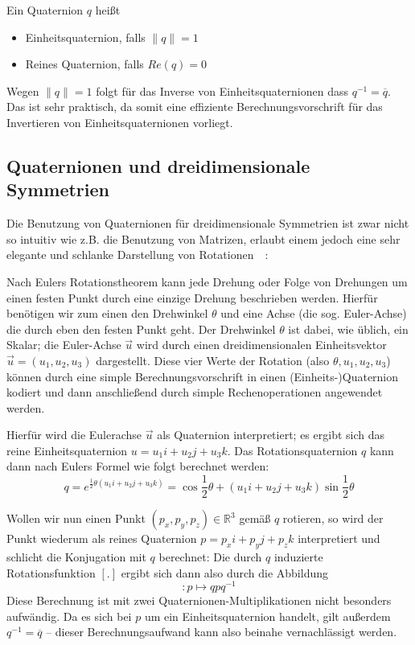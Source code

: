 \begin{definition}
Ein Quaternion $q$ heißt 
\begin{itemize}
\item Einheitsquaternion, falls $\|q\| = 1$
\item Reines Quaternion, falls $Re(q) = 0$
\end{itemize}\vspace{-0.9cm}
\end{definition}
Wegen $\|q\| = 1$ folgt für das Inverse von Einheitsquaternionen dass $q^{-1} = \overline{q}$. Das ist sehr praktisch,
da somit eine effiziente Berechnungsvorschrift für das Invertieren von Einheitsquaternionen vorliegt.

\subsection{Quaternionen und dreidimensionale Symmetrien}
Die Benutzung von Quaternionen für dreidimensionale Symmetrien ist zwar nicht so intuitiv wie z.B. die Benutzung von Matrizen,
erlaubt einem jedoch eine sehr elegante und schlanke Darstellung von Rotationen~\cite{conway2003}~\cite{du1964}: 

Nach Eulers Rotationstheorem kann jede Drehung oder Folge von Drehungen um einen festen Punkt durch eine einzige Drehung beschrieben werden.
Hierfür benötigen wir zum einen den Drehwinkel $\theta$ und eine Achse (die sog. Euler-Achse) die durch eben den festen Punkt geht.
Der Drehwinkel $\theta$ ist dabei, wie üblich, ein Skalar; die Euler-Achse $\overrightarrow{u}$ wird durch einen dreidimensionalen Einheitsvektor $\overrightarrow{u} = (u_1,u_2,u_3)$ dargestellt. Diese vier Werte der Rotation (also $\theta, u_1, u_2, u_3$) können durch eine simple
Berechnungsvorschrift in einen (Einheits-)Quaternion kodiert und dann anschließend durch simple Rechenoperationen
angewendet werden.

Hierfür wird die Eulerachse $\overrightarrow{u}$ als Quaternion interpretiert; es ergibt sich das reine Einheitsquaternion
$u = u_1 i + u_2 j + u_3 k$. Das Rotationsquaternion $q$ kann dann nach Eulers Formel wie folgt berechnet werden:
\begin{equation*}
q = e^{\frac{1}{2} \theta \left( u_1 i + u_2 j + u_3 k \right)} = \cos \frac{1}{2} \theta + \left( u_1 i + u_2 j + u_3 k \right) \sin \frac{1}{2} \theta
\end{equation*}

\noindent Wollen wir nun einen Punkt $(p_x, p_y, p_z) \in \mathbb{R}^3$ gemäß $q$ rotieren, so wird der Punkt wiederum als reines Quaternion
$p = p_x i + p_y j + p_z k$ interpretiert und schlicht die Konjugation mit $q$ berechnet:
Die durch $q$ induzierte Rotationsfunktion $[.]$ ergibt sich dann also durch die Abbildung
\begin{equation*}
[q]: p \mapsto q p q^{-1}
\end{equation*}
Diese Berechnung ist mit zwei Quaternionen-Multiplikationen nicht besonders aufwändig.
Da es sich bei $p$ um ein Einheitsquaternion handelt, gilt außerdem $q^{-1} = \overline{q}$ -- dieser Berechnungsaufwand
kann also beinahe vernachlässigt werden. \\

